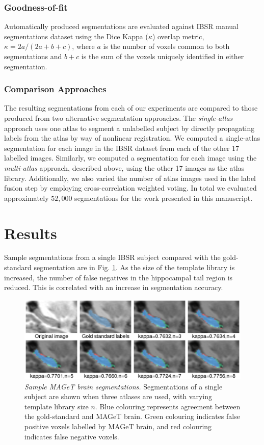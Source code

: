 \documentclass{article}\usepackage{graphicx, color}
\begin{document}
\subsubsection{Goodness-of-fit}
Automatically produced segmentations are evaluated against IBSR manual
segmentations dataset using the Dice Kappa ($\kappa$) overlap metric, $\kappa =
{2a}/{(2a+b+c)}$, where $a$ is the number of voxels common to both
segmentations and $b+c$ is the sum of the voxels uniquely identified in either
segmentation.

\subsubsection{Comparison Approaches}
The resulting segmentations from each of our experiments are compared to those
produced from two alternative segmentation approaches. The {\it single-atlas}
approach uses one atlas to segment a unlabelled subject by directly propagating
labels from the atlas by way of nonlinear registration.  We computed a
single-atlas segmentation for each image in the IBSR dataset from each of the
other 17 labelled images.  Similarly, we computed a segmentation for each image
using the {\it multi-atlas} approach, described above, using the other 17
images as the atlas library.  Additionally, we also varied the number of atlas
images used in the label fusion step by employing cross-correlation weighted
voting.  In total we evaluated approximately $52,000$ segmentations for the
work presented in this manuscript.

\section{Results}

Sample segmentations from a single IBSR subject compared with the gold-standard
segmentation are in Fig.  \ref{montage}.  As the size of the template library
is increased, the number of false negatives in the hippocampal tail region is
reduced.  This is correlated with an increase in segmentation accuracy.

\begin{figure}[h]
\begin{minipage}[b]{1.0\linewidth}
  \centering
  \includegraphics[width=\textwidth]{montage.png}
\end{minipage}
\caption{{\em Sample MAGeT brain segmentations.} 
Segmentations of a single subject are shown when three atlases are used, with
varying template library size $n$. Blue colouring represents agreement between
the gold-standard and MAGeT brain. Green colouring indicates false positive
voxels labelled by MAGeT brain, and red colouring indicates false negative
voxels.
} 
\label{montage}
\end{figure}
\end{document}
